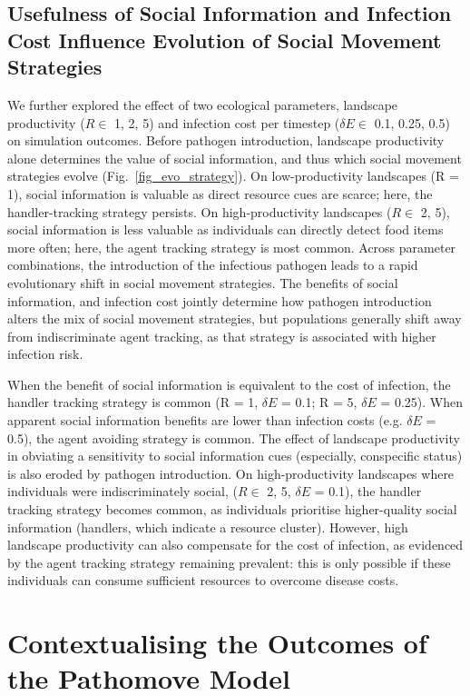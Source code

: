 \subsection*{Usefulness of Social Information and Infection Cost Influence Evolution of Social Movement Strategies}

We further explored the effect of two ecological parameters, landscape productivity ($R \in $ 1, 2, 5) and infection cost per timestep ($\delta E \in$ 0.1, 0.25, 0.5) on simulation outcomes.
Before pathogen introduction, landscape productivity alone determines the value of social information, and thus which social movement strategies evolve (Fig.~\ref{fig_evo_strategy}).
On low-productivity landscapes (R = 1), social information is valuable as direct resource cues are scarce; here, the handler-tracking strategy persists.
On high-productivity landscapes ($R \in$ 2, 5), social information is less valuable as individuals can directly detect food items more often; here, the agent tracking strategy is most common.
Across parameter combinations, the introduction of the infectious pathogen leads to a rapid evolutionary shift in social movement strategies.
The benefits of social information, and infection cost jointly determine how pathogen introduction alters the mix of social movement strategies, but populations generally shift away from indiscriminate agent tracking, as that strategy is associated with higher infection risk.

When the benefit of social information is equivalent to the cost of infection, the handler tracking strategy is common (R = 1, $\delta E$ = 0.1; R = 5, $\delta E$ = 0.25).
When apparent social information benefits are lower than infection costs (e.g. $\delta E$ = 0.5), the agent avoiding strategy is common.
The effect of landscape productivity in obviating a sensitivity to social information cues (especially, conspecific status) is also eroded by pathogen introduction.
On high-productivity landscapes where individuals were indiscriminately social, ($R \in$ 2, 5, $\delta E$ = 0.1), the handler tracking strategy becomes common, as individuals prioritise higher-quality social information (handlers, which indicate a resource cluster).
However, high landscape productivity can also compensate for the cost of infection, as evidenced by the agent tracking strategy remaining prevalent: this is only possible if these individuals can consume sufficient resources to overcome disease costs.

\section*{Contextualising the Outcomes of the Pathomove Model}

